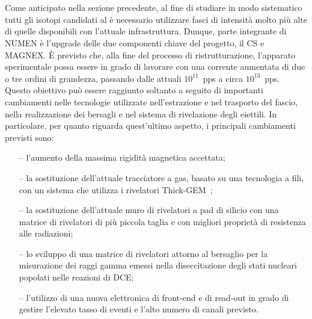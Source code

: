 

\section{} \label{sez:upgrade_apparato}

Come anticipato nella sezione precedente, al fine di studiare in modo sistematico tutti gli isotopi candidati al \doppiobeta{} è necessario utilizzare fasci di intensità molto più alte di quelle disponibili con l'attuale infrastruttura. Dunque, parte integrante di NUMEN è l'upgrade delle due componenti chiave del progetto, il CS e MAGNEX. 
È previsto che, alla fine del processo di ristrutturazione, l'apparato sperimentale possa essere in grado di lavorare con una corrente aumentata di due o tre ordini di grandezza, passando dalle attuali $10^{11}$~pps a circa $10^{13}$~pps.
Questo obiettivo può essere raggiunto soltanto a seguito di importanti cambiamenti nelle tecnologie utilizzate nell'estrazione e nel trasporto del fascio, nella realizzazione dei bersagli e nel sistema di rivelazione degli eiettili. 
In particolare, per quanto riguarda quest'ultimo aspetto, i principali cambiamenti previsti sono:
\begin{itemize}
	\item[--] l'aumento della massima rigidità magnetica accettata;
	\item[--] la sostituzione dell'attuale tracciatore a gas, basato su una tecnologia a fili, con un sistema che utilizza i rivelatori Thick-GEM~\cite{cortesi:rsi17};
	\item[--] la sostituzione dell'attuale muro di rivelatori a pad di silicio con una matrice di rivelatori di più piccola taglia e con migliori proprietà di resistenza alle radiazioni;
	\item[--] lo sviluppo di una matrice di rivelatori attorno al bersaglio per la misurazione dei raggi gamma emessi nella diseccitazione degli stati nucleari popolati nelle reazioni di DCE;
	\item[--] l'utilizzo di una nuova elettronica di front-end e di read-out in grado di gestire l'elevato tasso di eventi e l'alto numero di canali previsto.
\end{itemize}
